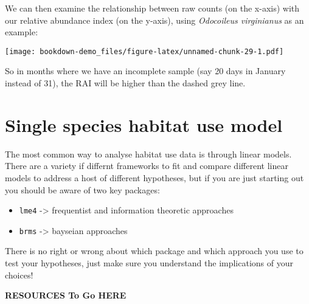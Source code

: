 \documentclass[]{book}
\newenvironment{Shaded}{\begin{snugshade}}{\end{snugshade}}
\newcommand{\KeywordTok}[1]{\textcolor[rgb]{0.13,0.29,0.53}{\textbf{#1}}}
\newcommand{\DataTypeTok}[1]{\textcolor[rgb]{0.13,0.29,0.53}{#1}}
\newcommand{\DecValTok}[1]{\textcolor[rgb]{0.00,0.00,0.81}{#1}}
\newcommand{\FloatTok}[1]{\textcolor[rgb]{0.00,0.00,0.81}{#1}}
\newcommand{\StringTok}[1]{\textcolor[rgb]{0.31,0.60,0.02}{#1}}
\newcommand{\OperatorTok}[1]{\textcolor[rgb]{0.81,0.36,0.00}{\textbf{#1}}}
\newcommand{\NormalTok}[1]{#1}
\providecommand{\tightlist}{%
  \setlength{\itemsep}{0pt}\setlength{\parskip}{0pt}}
\begin{document}
We can then examine the relationship between raw counts (on the x-axis)
with our relative abundance index (on the y-axis), using
\emph{Odocoileus virginianus} as an example:

\begin{Shaded}
\end{Shaded}

\texttt{[image: bookdown-demo\_files/figure-latex/unnamed-chunk-29-1.pdf]}

So in months where we have an incomplete sample (say 20 days in January
instead of 31), the RAI will be higher than the dashed grey line.

\section{Single species habitat use
model}\label{single-species-habitat-use-model}

The most common way to analyse habitat use data is through linear
models. There are a variety if differnt frameworks to fit and compare
different linear models to address a host of different hypotheses, but
if you are just starting out you should be aware of two key packages:

\begin{itemize}
\tightlist
\item
  \texttt{lme4} -\textgreater{} frequentist and information theoretic
  approaches
\item
  \texttt{brms} -\textgreater{} bayseian approaches
\end{itemize}

There is no right or wrong about which package and which approach you
use to test your hypotheses, just make sure you understand the
implications of your choices!

\textbf{RESOURCES To Go HERE}
\end{document}
